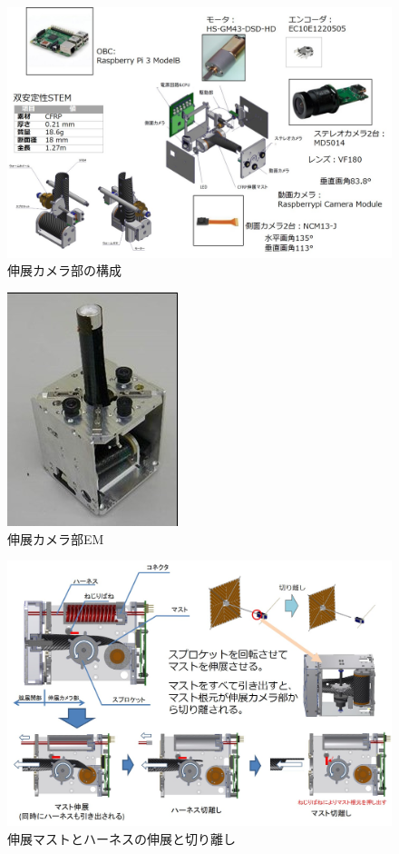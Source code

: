 \begin{figure}[H]
	\centering
	\includegraphics[width=.8\textwidth]{03/fig/3-9-2-1-1.jpg}
	\caption{伸展カメラ部の構成}
	\label{fig3-9-2-1-1}
\end{figure}
\begin{figure}[H]
	\centering
	\includegraphics[width=.4\textwidth]{03/fig/3-9-2-1-2.jpg}
	\caption{伸展カメラ部EM}
	\label{fig3-9-2-1-2}
\end{figure}
\begin{figure}[H]
	\centering
	\includegraphics[width=.8\textwidth]{03/fig/3-9-2-1-3.jpg}
	\caption{伸展マストとハーネスの伸展と切り離し}
	\label{fig3-9-2-1-3}
\end{figure}

